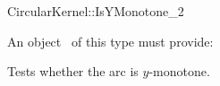 \begin{ccRefFunctionObjectConcept}{CircularKernel::IsYMonotone_2}


An object \ccVar\ of this type must provide:

{Tests whether the arc is $y$-monotone.}

\ccHasModels


\ccSeeAlso


\end{ccRefFunctionObjectConcept}
